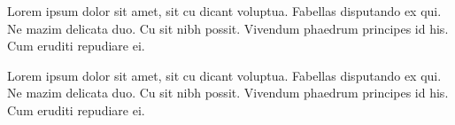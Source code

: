 \documentclass[letterpaper,10pt]{article}
\begin{document}
Lorem ipsum dolor sit amet, sit cu dicant voluptua. Fabellas disputando ex qui. Ne mazim delicata duo. Cu sit nibh possit. Vivendum phaedrum principes id his. Cum eruditi repudiare ei.

Lorem ipsum dolor sit amet, sit cu dicant voluptua. Fabellas disputando ex qui. Ne mazim delicata duo. Cu sit nibh possit. Vivendum phaedrum principes id his. Cum eruditi repudiare ei.

\end{document}
